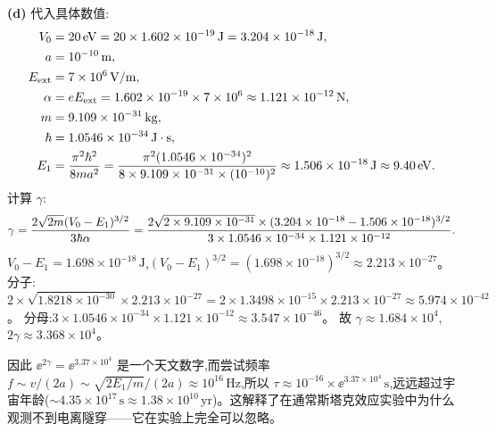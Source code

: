 \begin{solution}
\textbf{(d)} 代入具体数值:
\begin{align*}
V_0 &= 20\,\mathrm{eV}=20\times1.602\times10^{-19}\,\mathrm{J}=3.204\times10^{-18}\,\mathrm{J},\\
a &= 10^{-10}\,\mathrm{m},\\
E_{\rm ext} &= 7\times10^6\,\mathrm{V/m},\\
\alpha &= eE_{\rm ext}=1.602\times10^{-19}\times7\times10^6\approx1.121\times10^{-12}\,\mathrm{N},\\
m &= 9.109\times10^{-31}\,\mathrm{kg},\\
\hbar &= 1.0546\times10^{-34}\,\mathrm{J\cdot s},\\
E_1 &= {\pi^2\hbar^2\over8ma^2}
={\pi^2(1.0546\times10^{-34})^2\over8\times9.109\times10^{-31}\times(10^{-10})^2}
\approx 1.506\times10^{-18}\,\mathrm{J}\approx 9.40\,\mathrm{eV}.
\end{align*}
计算 $\gamma$:
\[
\gamma={2\sqrt{2m}(V_0-E_1)^{3/2}\over3\hbar\alpha}
={2\sqrt{2\times9.109\times10^{-31}}\times(3.204\times10^{-18}-1.506\times10^{-18})^{3/2}
\over3\times1.0546\times10^{-34}\times1.121\times10^{-12}}.
\]
$V_0-E_1=1.698\times10^{-18}\,\mathrm{J}$,$(V_0-E_1)^{3/2}=(1.698\times10^{-18})^{3/2}\approx2.213\times10^{-27}$。
分子:$2\times\sqrt{1.8218\times10^{-30}}\times2.213\times10^{-27}
=2\times1.3498\times10^{-15}\times2.213\times10^{-27}\approx5.974\times10^{-42}$。
分母:$3\times1.0546\times10^{-34}\times1.121\times10^{-12}\approx3.547\times10^{-46}$。
故 $\gamma\approx1.684\times10^4$,$2\gamma\approx3.368\times10^4$。

因此 $\ee^{2\gamma}=\ee^{3.37\times10^4}$ 是一个天文数字,而尝试频率 $f\sim v/(2a)\sim\sqrt{2E_1/m}/(2a)\approx 10^{16}\,\mathrm{Hz}$,所以 $\tau\approx 10^{-16}\times \ee^{3.37\times10^4}\,\mathrm{s}$,远远超过宇宙年龄($\sim4.35\times10^{17}\,\mathrm{s}\approx1.38\times10^{10}\,\mathrm{yr}$)。这解释了在通常斯塔克效应实验中为什么观测不到电离隧穿——它在实验上完全可以忽略。
\end{solution}

